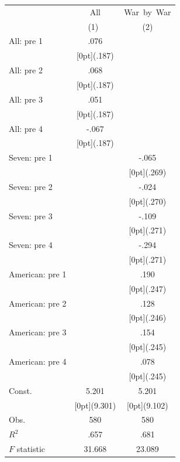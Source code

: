 \documentclass[12pt,a4paper,titlepage]{article}
\begin{document}
{\newpage
{}
\begin{tabular*}{\textwidth}{@{\extracolsep{\fill}}lcc}		
	& \multicolumn{1}{c}{All} &	\multicolumn{1}{c}{War~by~War} \\
\cline{2-3}		
	& \multicolumn{1}{c}{(1)\mbox{\ }} &	\multicolumn{1}{c}{(2)} \\
\hline		
All: pre 1 &	.076 &	\\
&	\raisebox{.7ex}[0pt]{\scriptsize (.187)} &	\\
All: pre 2 &	.068 &	\\
&	\raisebox{.7ex}[0pt]{\scriptsize (.187)} &	\\
All: pre 3 &	.051 &	\\
&	\raisebox{.7ex}[0pt]{\scriptsize (.187)} &	\\
All: pre 4 &	-.067 &	\\
&	\raisebox{.7ex}[0pt]{\scriptsize (.187)} &	\\
Seven: pre 1 &	&	-.065 \\
&	&	\raisebox{.7ex}[0pt]{\scriptsize (.269)} \\
Seven: pre 2 &	&	-.024 \\
&	&	\raisebox{.7ex}[0pt]{\scriptsize (.270)} \\
Seven: pre 3 &	&	-.109 \\
&	&	\raisebox{.7ex}[0pt]{\scriptsize (.271)} \\
Seven: pre 4 &	&	-.294 \\
&	&	\raisebox{.7ex}[0pt]{\scriptsize (.271)} \\
American: pre 1 &	&	.190 \\
&	&	\raisebox{.7ex}[0pt]{\scriptsize (.247)} \\
American: pre 2 &	&	.128 \\
&	&	\raisebox{.7ex}[0pt]{\scriptsize (.246)} \\
American: pre 3 &	&	.154 \\
&	&	\raisebox{.7ex}[0pt]{\scriptsize (.245)} \\
American: pre 4 &	&	.078 \\
&	&	\raisebox{.7ex}[0pt]{\scriptsize (.245)} \\
Const. &	5.201 &	5.201 \\
&	\raisebox{.7ex}[0pt]{\scriptsize (9.301)} &	\raisebox{.7ex}[0pt]{\scriptsize (9.102)} \\
Obs. &	580 &	580 \\
$ R^2$ &	.657 &	.681 \\
$ F$ statistic &	31.668 &	23.089 \\
\hline\hline		
\end{tabular*}%


}
\end{document}
